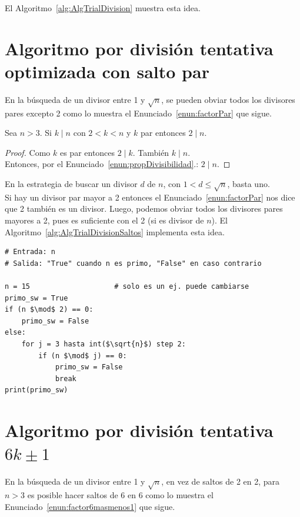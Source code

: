 \noindent El Algoritmo~\ref{alg:AlgTrialDivision} muestra esta idea.

\section{Algoritmo por división tentativa optimizada con salto par}
En la búsqueda de un divisor entre 1 y $\sqrt{n}$, se pueden obviar todos los divisores pares excepto 2 como lo muestra el  Enunciado~\ref{enun:factorPar} que sigue.

\begin{enunciado} \label{enun:factorPar}\leavevmode\par Sea $n > 3$. 
Si $k \mid n$ con $2 < k < n$ y $k$ par entonces $2 \mid n$.
\end{enunciado}

\begin{proof} Como $k$ es par entonces $2 \mid k$. También $k \mid n$. \\ \setcounter{enumi}{5} Entonces, por el Enunciado~\ref{enun:propDivisibilidad}.: $2 \mid n$.
\end{proof}

En la estrategia de buscar un divisor $d$ de $n$, con $1 < d \leq \sqrt{n}$, basta uno. \\
Si hay un divisor par mayor a 2 entonces el Enunciado~\ref{enun:factorPar} nos dice que 2 también es un divisor.
Luego, podemos obviar todos los divisores pares mayores a 2, pues es suficiente con el 2 (si es divisor de $n$). El Algoritmo~\ref{alg:AlgTrialDivisionSaltos} implementa esta idea.

\begin{lstlisting}[caption={Algoritmo de testeo de primalidad por división tentativa optimizada}, label={alg:AlgTrialDivisionSaltos}, mathescape=true]
# Entrada: n
# Salida: "True" cuando n es primo, "False" en caso contrario

n = 15                    # solo es un ej. puede cambiarse
primo_sw = True 
if (n $\mod$ 2) == 0:
    primo_sw = False
else:
    for j = 3 hasta int($\sqrt{n}$) step 2:
        if (n $\mod$ j) == 0:
            primo_sw = False
            break              
print(primo_sw)
\end{lstlisting}

\section{Algoritmo por división tentativa $6k \pm 1$}
En la búsqueda de un divisor entre 1 y $\sqrt{n}$, en vez de saltos de 2 en 2, para $n > 3$ es posible hacer saltos de 6 en 6 como lo muestra el Enunciado~\ref{enun:factor6masmenos1} que sigue.

